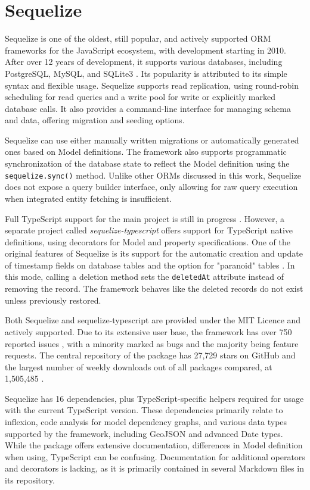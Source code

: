 \section{Sequelize}

Sequelize is one of the oldest, still popular, and actively supported ORM
frameworks for the JavaScript ecosystem, with development starting in 2010.
After over 12 years of development, it supports various databases, including
PostgreSQL, MySQL, and SQLite3 \cite{sequelizeDocs}. Its popularity is
attributed to its simple syntax and flexible usage. Sequelize supports read
replication, using round-robin scheduling for read queries and a write pool for
write or explicitly marked database calls. It also provides a command-line
interface for managing schema and data, offering migration and seeding options.

Sequelize can use either manually written migrations or automatically generated
ones based on Model definitions. The framework also supports programmatic
synchronization of the database state to reflect the Model definition using the
\texttt{sequelize.sync()} method. Unlike other ORMs discussed in this work,
Sequelize does not expose a query builder interface, only allowing for raw query
execution when integrated entity fetching is insufficient.

Full TypeScript support for the main project is still in progress
\cite{sequelizeTypescriptSupport}. However, a separate project called
\textit{sequelize-typescript} \cite{sequelizeTypescriptNpm} offers support for
TypeScript native definitions, using decorators for Model and property
specifications. One of the original features of Sequelize is its support for the
automatic creation and update of timestamp fields on database tables and the
option for "paranoid" tables \cite{sequelizeParanoid}. In this mode, calling a
deletion method sets the \texttt{deletedAt} attribute instead of removing the
record. The framework behaves like the deleted records do not exist unless
previously restored.

Both Sequelize and sequelize-typescript are provided under the MIT Licence and
actively supported. Due to its extensive user base, the framework has over 750
reported issues \cite{sequelizeGitHub}, with a minority marked as bugs and the
majority being feature requests. The central repository of the package has
27,729 stars on GitHub and the largest number of weekly downloads out of all
packages compared, at 1,505,485 \cite{sequelizeNpm}.

Sequelize has 16 dependencies, plus TypeScript-specific helpers required for
usage with the current TypeScript version. These dependencies primarily relate
to inflexion, code analysis for model dependency graphs, and various data types
supported by the framework, including GeoJSON and advanced Date types. While the
package offers extensive documentation, differences in Model definition when
using, TypeScript can be confusing. Documentation for additional operators and
decorators is lacking, as it is primarily contained in several Markdown files in
its repository.


